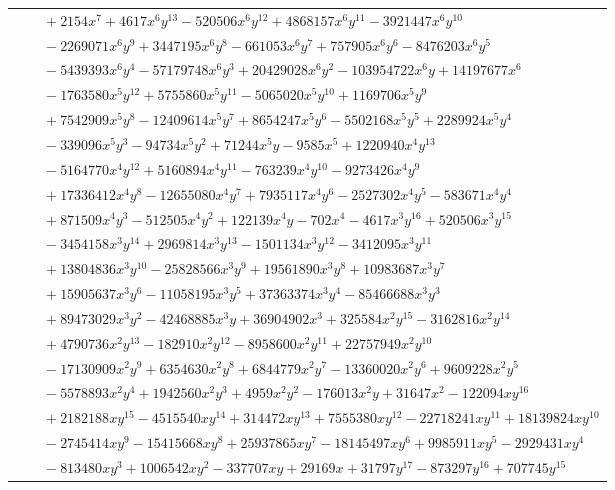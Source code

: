\documentclass[11pt]{article}
\begin{document}
\begin{longtable}{@{}ll@{}}
 & $\quad +2154x^{7}+4617x^{6}y^{13}-520506x^{6}y^{12}+4868157x^{6}y^{11}-3921447x^{6}y^{10}$\\
 & $\quad -2269071x^{6}y^{9}+3447195x^{6}y^{8}-661053x^{6}y^{7}+757905x^{6}y^{6}-8476203x^{6}y^{5}$\\
 & $\quad -5439393x^{6}y^{4}-57179748x^{6}y^{3}+20429028x^{6}y^{2}-103954722x^{6}y+14197677x^{6}$\\
 & $\quad -1763580x^{5}y^{12}+5755860x^{5}y^{11}-5065020x^{5}y^{10}+1169706x^{5}y^{9}$\\
 & $\quad +7542909x^{5}y^{8}-12409614x^{5}y^{7}+8654247x^{5}y^{6}-5502168x^{5}y^{5}+2289924x^{5}y^{4}$\\
 & $\quad -339096x^{5}y^{3}-94734x^{5}y^{2}+71244x^{5}y-9585x^{5}+1220940x^{4}y^{13}$\\
 & $\quad -5164770x^{4}y^{12}+5160894x^{4}y^{11}-763239x^{4}y^{10}-9273426x^{4}y^{9}$\\
 & $\quad +17336412x^{4}y^{8}-12655080x^{4}y^{7}+7935117x^{4}y^{6}-2527302x^{4}y^{5}-583671x^{4}y^{4}$\\
 & $\quad +871509x^{4}y^{3}-512505x^{4}y^{2}+122139x^{4}y-702x^{4}-4617x^{3}y^{16}+520506x^{3}y^{15}$\\
 & $\quad -3454158x^{3}y^{14}+2969814x^{3}y^{13}-1501134x^{3}y^{12}-3412095x^{3}y^{11}$\\
 & $\quad +13804836x^{3}y^{10}-25828566x^{3}y^{9}+19561890x^{3}y^{8}+10983687x^{3}y^{7}$\\
 & $\quad +15905637x^{3}y^{6}-11058195x^{3}y^{5}+37363374x^{3}y^{4}-85466688x^{3}y^{3}$\\
 & $\quad +89473029x^{3}y^{2}-42468885x^{3}y+36904902x^{3}+325584x^{2}y^{15}-3162816x^{2}y^{14}$\\
 & $\quad +4790736x^{2}y^{13}-182910x^{2}y^{12}-8958600x^{2}y^{11}+22757949x^{2}y^{10}$\\
 & $\quad -17130909x^{2}y^{9}+6354630x^{2}y^{8}+6844779x^{2}y^{7}-13360020x^{2}y^{6}+9609228x^{2}y^{5}$\\
 & $\quad -5578893x^{2}y^{4}+1942560x^{2}y^{3}+4959x^{2}y^{2}-176013x^{2}y+31647x^{2}-122094xy^{16}$\\
 & $\quad +2182188xy^{15}-4515540xy^{14}+314472xy^{13}+7555380xy^{12}-22718241xy^{11}+18139824xy^{10}$\\
 & $\quad -2745414xy^{9}-15415668xy^{8}+25937865xy^{7}-18145497xy^{6}+9985911xy^{5}-2929431xy^{4}$\\
 & $\quad -813480xy^{3}+1006542xy^{2}-337707xy+29169x+31797y^{17}-873297y^{16}+707745y^{15}$\\

\end{longtable}
\end{document}
